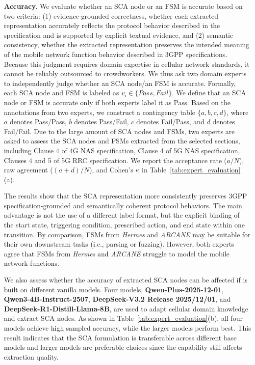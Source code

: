 \noindent \textbf{Accuracy.} We evaluate whether an SCA node or an FSM is accurate based on two criteria: (1) evidence-grounded correctness, whether each extracted representation accurately reflects the protocol behavior described in the specification and is supported by explicit textual evidence, and (2) semantic consistency, whether the extracted representation preserves the intended meaning of the mobile network function behavior described in 3GPP specifications. Because this judgment requires domain expertise in cellular network standards, it cannot be reliably outsourced to crowdworkers. We thus ask two domain experts to independently judge whether an SCA node/an FSM is accurate. Formally, each SCA node and FSM is labeled as $v_i \in \{Pass, Fail\}$. We define that an SCA node or FSM is accurate only if both experts label it as Pass. Based on the annotations from two experts, we construct a contingency table $\{a,b,c,d\}$, where $a$ denotes Pass/Pass, $b$ denotes Pass/Fail, $c$ denotes Fail/Pass, and $d$ denotes Fail/Fail. Due to the large amount of SCA nodes and FSMs, two experts are asked to assess the SCA nodes and FSMs extracted from the selected sections, including Clause 4 of 4G NAS specification, Clause 4 of 5G NAS specification, Clauses 4 and 5 of 5G RRC specification. 
We report the acceptance rate ($a/N$), raw agreement ($(a+d)/N$), and Cohen's $\kappa$ in Table~\ref{tab:expert_evaluation} (a).





The results show that the SCA representation more consistently preserves 3GPP specification-grounded and semantically coherent protocol behaviors. The main advantage is not the use of a different label format, but the explicit binding of the start state, triggering condition, prescribed action, and end state within one transition. By comparison, FSMs from \textit{Hermes} and \textit{ARCANE} may be suitable for their own downstream tasks (i.e., parsing or fuzzing). However, both experts agree that FSMs from \textit{Hermes} and \textit{ARCANE} struggle to model the mobile network functions.

We also assess whether the accuracy of extracted SCA nodes can be affected if \core is built on different vanilla models. Four models, \textbf{Qwen-Plus-2025-12-01}, \textbf{Qwen3-4B-Instruct-2507}, \textbf{DeepSeek-V3.2 Release 2025/12/01}, and \textbf{DeepSeek-R1-Distill-Llama-8B}, are used to adapt cellular domain knowledge and extract SCA nodes. As shown in Table~\ref{tab:expert_evaluation}(b), all four models achieve high sampled accuracy, while the larger models perform best. This result indicates that the SCA formulation is transferable across different base models and larger models are preferable choices since the capability still affects extraction quality. 







